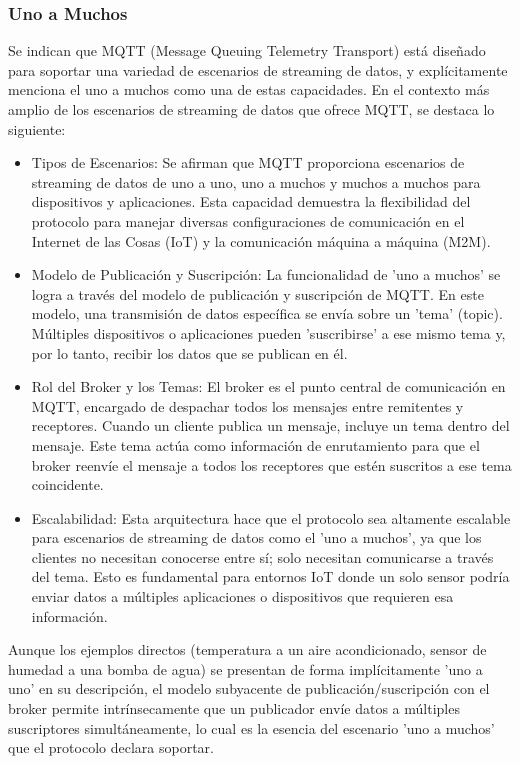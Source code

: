 \documentclass{report}
\begin{document}
\subsubsection{Uno a Muchos}
Se  indican que MQTT (Message Queuing Telemetry Transport) está diseñado para soportar una variedad de escenarios 
de streaming de datos, y explícitamente menciona el uno a muchos como una de estas capacidades.
En el contexto más amplio de los escenarios de streaming de datos que ofrece MQTT, se destaca lo siguiente:
\begin{itemize}
    \item Tipos de Escenarios: Se  afirman que MQTT proporciona escenarios de streaming de datos de uno a uno, uno a muchos 
    y muchos a muchos para dispositivos y aplicaciones. Esta capacidad demuestra la flexibilidad del protocolo para manejar diversas 
    configuraciones de comunicación en el Internet de las Cosas (IoT) y la comunicación máquina a máquina (M2M).
    \item Modelo de Publicación y Suscripción: La funcionalidad de 'uno a muchos' se logra a través del modelo de publicación y 
    suscripción de MQTT. En este modelo, una transmisión de datos específica se envía sobre un 'tema' (topic). Múltiples dispositivos 
    o aplicaciones pueden 'suscribirse' a ese mismo tema y, por lo tanto, recibir los datos que se publican en él.
    \item Rol del Broker y los Temas: El broker es el punto central de comunicación en MQTT, encargado de despachar todos los 
    mensajes entre remitentes y receptores. Cuando un cliente publica un mensaje, incluye un tema dentro del mensaje. Este tema 
    actúa como información de enrutamiento para que el broker reenvíe el mensaje a todos los receptores que estén suscritos a ese tema coincidente.
    \item Escalabilidad: Esta arquitectura hace que el protocolo sea altamente escalable para escenarios de streaming de datos como 
    el 'uno a muchos', ya que los clientes no necesitan conocerse entre sí; solo necesitan comunicarse a través del tema. Esto es 
    fundamental para entornos IoT donde un solo sensor podría enviar datos a múltiples aplicaciones o dispositivos que 
    requieren esa información.
\end{itemize}
Aunque los ejemplos directos (temperatura a un aire acondicionado, sensor de humedad a una bomba de agua) se 
presentan de forma implícitamente 'uno a uno' en su descripción, el modelo subyacente de publicación/suscripción con el broker 
permite intrínsecamente que un publicador envíe datos a múltiples suscriptores simultáneamente, lo cual es la esencia del escenario 
'uno a muchos' que el protocolo declara soportar.
\end{document}
